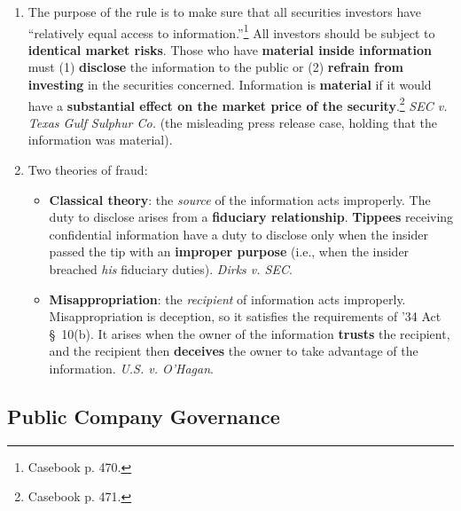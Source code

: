 \begin{enumerate}
\begin{enumerate}
\begin{enumerate}
            \item The purpose of the rule is to make sure that all securities 
            investors have ``relatively equal access to 
            information.''\footnote{Casebook p. 470.} All investors should be 
            subject to \textbf{identical market risks}. Those who have 
            \textbf{material inside information} must (1) \textbf{disclose} 
            the information to the public or (2) \textbf{refrain from 
            investing} in the securities concerned. Information is 
            \textbf{material} if it would have a \textbf{substantial effect on 
            the market price of the security}.\footnote{Casebook p. 471.} 
            \emph{SEC v. Texas Gulf Sulphur Co.} (the misleading press release 
            case, holding that the information was material). %
            \item Two theories of fraud:
            \begin{itemize}
                \item \textbf{Classical theory}: the \emph{source} of the 
                information acts improperly. The duty to disclose arises from 
                a \textbf{fiduciary relationship}. \textbf{Tippees} receiving 
                confidential information have a duty to disclose only when the 
                insider passed the tip with an \textbf{improper purpose} 
                (i.e., when the insider breached \emph{his} fiduciary duties).  
                \emph{Dirks v. SEC}.
                \item \textbf{Misappropriation}: the \emph{recipient} of 
                information acts improperly. Misappropriation is deception, so 
                it satisfies the requirements of '34 Act \S\ 10(b). It arises 
                when the owner of the information \textbf{trusts} the 
                recipient, and the recipient then \textbf{deceives} the owner 
                to take advantage of the information.  \emph{U.S. v. O'Hagan}. 
            \end{itemize}
        \end{enumerate}
    \end{enumerate}
\end{enumerate}

\newpage

\subsection{Public Company Governance}

